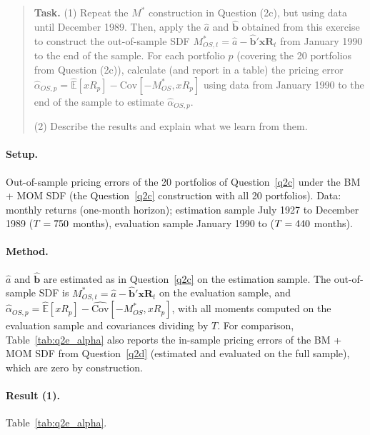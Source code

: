 \documentclass[11pt]{article}
\newcommand{\task}[1]{\begin{quote}\small\textbf{Task.} #1\end{quote}}
\begin{document}
\subsection{}\label{q2e}
\task{(1) Repeat the $M^*$ construction in Question (2c), but using data until December 1989. Then, apply the $\hat{a}$ and $\hat{\mathbf{b}}$ obtained from this exercise to construct the out-of-sample SDF $M^*_{OS,t} = \hat{a} - \hat{\mathbf{b}}'\mathbf{xR}_t$ from January 1990 to the end of the sample. For each portfolio $p$ (covering the 20 portfolios from Question (2c)), calculate (and report in a table) the pricing error $\hat{\alpha}_{OS,p} = \widehat{\mathbb{E}}[xR_p] - \widehat{\mathrm{Cov}}[-M^*_{OS}, xR_p]$ using data from January 1990 to the end of the sample to estimate $\hat{\alpha}_{OS,p}$.\par (2) Describe the results and explain what we learn from them.}
\paragraph{Setup.}
Out-of-sample pricing errors of the 20 portfolios of Question~\ref{q2c} under the BM + MOM SDF (the
Question~\ref{q2c} construction with all 20 portfolios). Data: monthly returns (one-month horizon);
estimation sample July 1927 to December 1989 ($T = 750$ months), evaluation sample January 1990 to
\QtwoeEnd{} ($T = 440$ months).

\paragraph{Method.}
$\hat{a}$ and $\hat{\mathbf{b}}$ are estimated as in Question~\ref{q2c} on the estimation sample. The
out-of-sample SDF is $M^*_{OS,t} = \hat{a} - \hat{\mathbf{b}}'\mathbf{xR}_t$ on the evaluation sample, and
$\hat{\alpha}_{OS,p} = \widehat{\mathbb{E}}[xR_p] - \widehat{\mathrm{Cov}}[-M^*_{OS}, xR_p]$, with all
moments computed on the evaluation sample and covariances dividing by $T$. For comparison,
Table~\ref{tab:q2e_alpha} also reports the in-sample pricing errors of the BM + MOM SDF from
Question~\ref{q2d} (estimated and evaluated on the full sample), which are zero by construction.

\paragraph{Result (1).}
Table~\ref{tab:q2e_alpha}.
\end{document}
